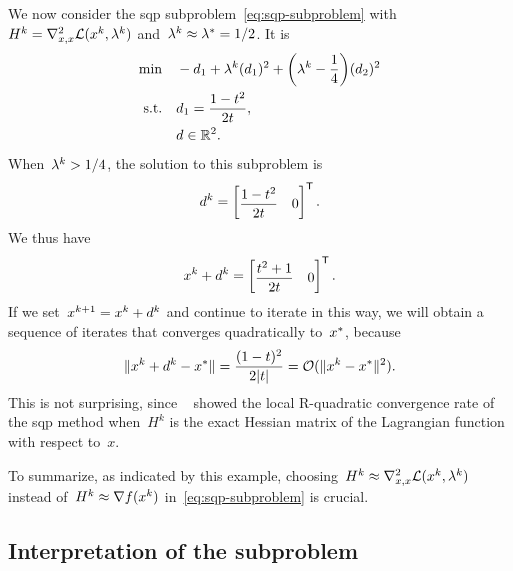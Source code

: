 We now consider the \gls{sqp} subproblem~\cref{eq:sqp-subproblem} with~$H^k = \nabla_{x, x}^2 \lag(\iter[k], \lm[k])$ and~$\lm[k] \approx \lm[\ast] = 1/2$.
It is
\begin{align*}
    \min        & \quad -\step_1 + \lm[k] (\step_1)^2 + \bigg( \lm[k] - \frac{1}{4} \bigg) (\step_2)^2\\
    \text{s.t.} & \quad \step_1 = \frac{1 - t^2}{2 t},\\
                & \quad \step \in \R^2. \nonumber
\end{align*}
When~$\lm[k] > 1/4$, the solution to this subproblem is
\begin{equation*}
    \step[k] =
    \begin{bmatrix}
        \dfrac{1 - t^2}{2 t}    & 0
    \end{bmatrix}^{\T}.
\end{equation*}
We thus have
\begin{equation*}
    \iter[k] + \step[k] = 
    \begin{bmatrix}
        \dfrac{t^2 + 1}{2 t}  & 0
    \end{bmatrix}^{\T}.
\end{equation*}
If we set~$\iter[k + 1] = \iter[k] + \step[k]$ and continue to iterate in this way, we will obtain a sequence of iterates that converges quadratically to~$\iter[\ast]$, because
\begin{equation*}
    \norm{\iter[k] + \step[k] - \iter[\ast]} = \frac{(1 - t)^2}{2 \abs{t}} = \bigo(\norm{\iter[k] - \iter[\ast]}^2).
\end{equation*}
This is not surprising, since \citeauthor{Robinson_1974}~\cite{Robinson_1974} showed the local R-quadratic convergence rate of the \gls{sqp} method when~$H^k$ is the exact Hessian matrix of the Lagrangian function with respect to~$x$.

To summarize, as indicated by this example, choosing~$H^k \approx \nabla_{x, x}^2 \lag(\iter[k], \lm[k])$ instead of~$H^k \approx \nabla \obj(\iter[k])$ in~\cref{eq:sqp-subproblem} is crucial.

\subsection{Interpretation of the  subproblem}


